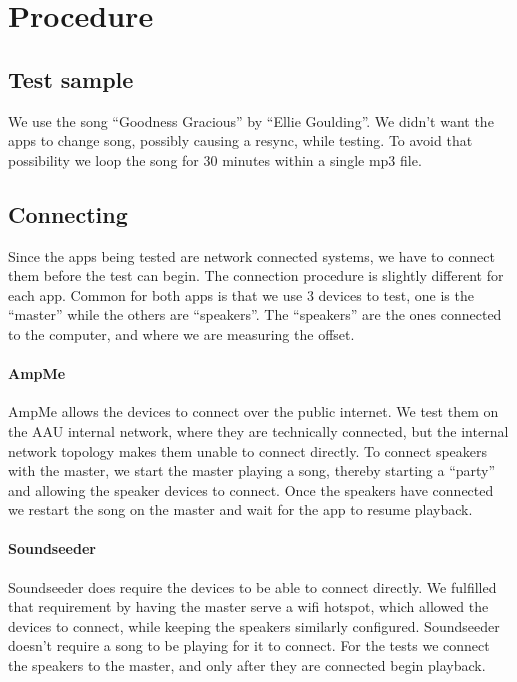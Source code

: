 \section{Procedure}\label{subsec:procedure}

\subsection{Test sample}
We use the song ``Goodness Gracious'' by ``Ellie Goulding''.  We didn't
want the apps to change song, possibly causing a resync, while testing.
To avoid that possibility we loop the song for 30 minutes within
a single mp3 file.

\subsection{Connecting}
Since the apps being tested are network connected systems, we have to
connect them before the test can begin. The connection procedure is
slightly different for each app. Common for both apps is that we use
3 devices to test, one is the ``master'' while the others are
``speakers''. The ``speakers'' are the ones connected to the computer,
and where we are measuring the offset.

\paragraph{AmpMe}
AmpMe allows the devices to connect over the public internet. We test
them on the AAU internal network, where they are technically connected,
but the internal network topology makes them unable to connect directly.
To connect speakers with the master, we start the master playing a song,
thereby starting a ``party'' and allowing the speaker devices to
connect. Once the speakers have connected we restart the song on the
master and wait for the app to resume playback.

\paragraph{Soundseeder}
Soundseeder does require the devices to be able to connect directly. We
fulfilled that requirement by having the master serve a wifi hotspot,
which allowed the devices to connect, while keeping the speakers
similarly configured. Soundseeder doesn't require a song to be playing
for it to connect. For the tests we connect the speakers to the master,
and only after they are connected begin playback.

